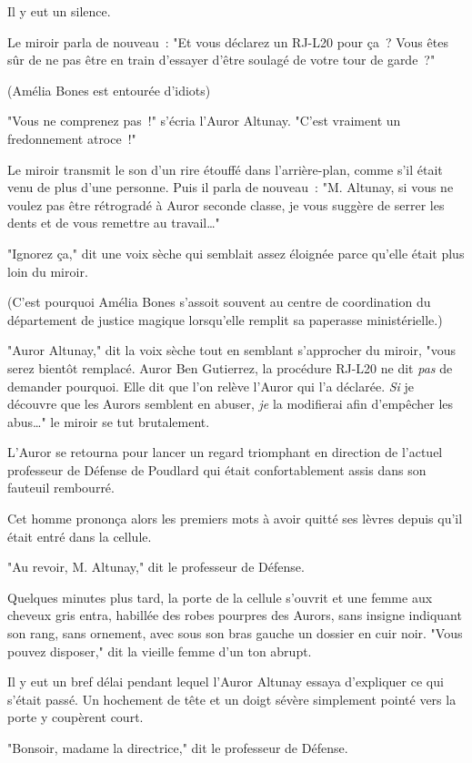 Il y eut un silence.

Le miroir parla de nouveau~: "Et vous déclarez un RJ-L20 pour ça~? Vous êtes sûr de ne pas être en train d'essayer d'être soulagé de votre tour de garde~?"

(Amélia Bones est entourée d'idiots)

"Vous ne comprenez pas~!" s'écria l'Auror Altunay. "C'est vraiment un fredonnement atroce~!"

Le miroir transmit le son d'un rire étouffé dans l'arrière-plan, comme s'il était venu de plus d'une personne. Puis il parla de nouveau~: "M. Altunay, si vous ne voulez pas être rétrogradé à Auror seconde classe, je vous suggère de serrer les dents et de vous remettre au travail…"

"Ignorez ça," dit une voix sèche qui semblait assez éloignée parce qu'elle était plus loin du miroir.

(C'est pourquoi Amélia Bones s'assoit souvent au centre de coordination du département de justice magique lorsqu'elle remplit sa paperasse ministérielle.)

"Auror Altunay," dit la voix sèche tout en semblant s'approcher du miroir, "vous serez bientôt remplacé. Auror Ben Gutierrez, la procédure RJ-L20 ne dit \emph{pas} de demander pourquoi. Elle dit que l'on relève l'Auror qui l'a déclarée. \emph{Si} je découvre que les Aurors semblent en abuser, \emph{je} la modifierai afin d'empêcher les abus…" le miroir se tut brutalement.

L'Auror se retourna pour lancer un regard triomphant en direction de l'actuel professeur de Défense de Poudlard qui était confortablement assis dans son fauteuil rembourré.

Cet homme prononça alors les premiers mots à avoir quitté ses lèvres depuis qu'il était entré dans la cellule.

"Au revoir, M. Altunay," dit le professeur de Défense.

Quelques minutes plus tard, la porte de la cellule s'ouvrit et une femme aux cheveux gris entra, habillée des robes pourpres des Aurors, sans insigne indiquant son rang, sans ornement, avec sous son bras gauche un dossier en cuir noir. "Vous pouvez disposer," dit la vieille femme d'un ton abrupt.

Il y eut un bref délai pendant lequel l'Auror Altunay essaya d'expliquer ce qui s'était passé. Un hochement de tête et un doigt sévère simplement pointé vers la porte y coupèrent court.

"Bonsoir, madame la directrice," dit le professeur de Défense.

